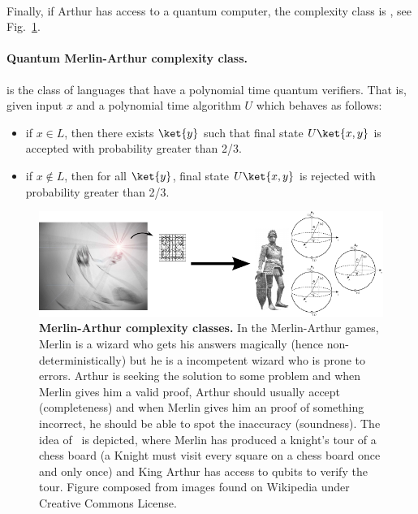 \documentclass[11pt,oneside,final]{huthesis}%
\begin{document}
\paragraph*{}
Finally, if Arthur has access to a quantum computer, the complexity class is {\qma}, see Fig.~\ref{fig:MA}.

\paragraph{Quantum Merlin-Arthur complexity class.} {\qma} is the class of languages that have a polynomial time quantum verifiers. That is, given input $x$ and a polynomial time algorithm $U$ which behaves as follows:
	\begin{itemize}
		\item if ${x}\in L$, then there exists $\ket{y}$ such that final state $U\ket{x,y}$ is accepted with probability greater than 2/3.
		\item if ${x}\notin L$, then for all $\ket{y}$, final state $U\ket{x,y}$ is rejected with probability greater than 2/3.
	\end{itemize}

\begin{figure}
\begin{center}
\includegraphics{./figures/qma}
\end{center}
\caption{\textbf{Merlin-Arthur complexity classes.} In the Merlin-Arthur games, Merlin is a wizard who gets his answers magically (hence non-deterministically) but he is a incompetent wizard who is prone to errors.  Arthur is seeking the solution to some problem and when Merlin gives him a valid proof, Arthur should usually accept (completeness) and when Merlin gives him an proof of something incorrect, he should be able to spot the inaccuracy (soundness). The idea of \qma~is depicted, where Merlin has produced a knight's tour of a chess board (a Knight must visit every square on a chess board once and only once) and King Arthur has access to qubits to verify the tour. Figure composed from images found on Wikipedia under Creative Commons License. }
\label{fig:MA}
\end{figure}
\end{document}
